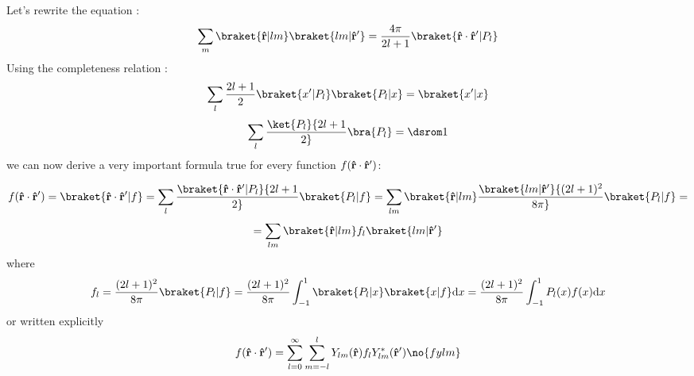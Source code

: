 Let's rewrite the equation :
$$\sum_m\braket{{\bf\hat r}|lm}\braket{lm|{\bf\hat r'}}=
{4\pi\over 2l+1} \braket{{\bf\hat r}\cdot{\bf\hat r'}|P_l}$$
Using the completeness relation :
$$\sum_l {2l+1\over2}\braket{x'|P_l}\braket{P_l|x}=\braket{x'|x}$$
$$\sum_l \ket{P_l}{2l+1\over2}\bra{P_l}=\one$$
we can now derive a very important formula true for every function 
$f({\bf\hat r}\cdot{\bf\hat r'})$:

$$f({\bf\hat r}\cdot{\bf\hat r'})=\braket{{\bf\hat r}\cdot{\bf\hat r'}|f}=
\sum_l \braket{{\bf\hat r}\cdot{\bf\hat r'}|P_l}{2l+1\over2}\braket{P_l|f}=
\sum_{lm}\braket{{\bf\hat r}|lm}\braket{lm|{\bf\hat r'}}{(2l+1)^2\over8\pi}
\braket{P_l|f}=
$$
$$=\sum_{lm}\braket{{\bf\hat r}|lm}f_l
\braket{lm|{\bf\hat r'}}
$$
where
$$f_l={(2l+1)^2\over8\pi}\braket{P_l|f}
={(2l+1)^2\over8\pi}\int_{-1}^1 \braket{P_l|x}\braket{x|f}\d x
={(2l+1)^2\over8\pi}\int_{-1}^1 P_l(x)f(x)\d x$$
or written explicitly 
$$f({\bf\hat r}\cdot{\bf\hat r'})=
\sum_{l=0}^\infty\sum_{m=-l}^l Y_{lm}({\bf\hat r}) f_l Y_{lm}^*({\bf\hat r'})
\no{fylm}
$$

